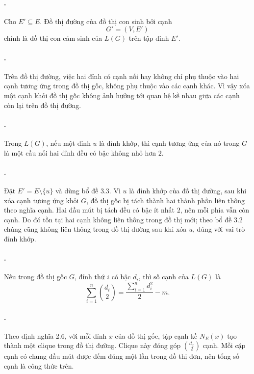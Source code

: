 \documentclass[11pt]{article}
\begin{document}
\paragraph{.}
Cho \(E'\subseteq E\). Đồ thị đường của đồ thị con sinh bởi cạnh
\[
  G'=(V,E')
\]
chính là đồ thị con cảm sinh của \(L(G)\) trên tập đỉnh \(E'\).

\paragraph{.}
Trên đồ thị đường, việc hai đỉnh có cạnh nối hay không chỉ phụ thuộc vào hai
cạnh tương ứng trong đồ thị gốc, không phụ thuộc vào các cạnh khác. Vì vậy xóa
một cạnh khỏi đồ thị gốc không ảnh hưởng tới quan hệ kề nhau giữa các cạnh còn
lại trên đồ thị đường.

\paragraph{.}
Trong \(L(G)\), nếu một đỉnh \(u\) là đỉnh khớp, thì cạnh tương ứng của nó
trong \(G\) là một cầu nối hai đỉnh đều có bậc không nhỏ hơn \(2\).

\paragraph{.}
Đặt \(E'=E\setminus\{u\}\) và dùng bổ đề 3.3. Vì \(u\) là đỉnh khớp của đồ thị
đường, sau khi xóa cạnh tương ứng khỏi \(G\), đồ thị gốc bị tách thành hai
thành phần liên thông theo nghĩa cạnh. Hai đầu mút bị tách đều có bậc ít nhất
\(2\), nên mỗi phía vẫn còn cạnh. Do đó tồn tại hai cạnh không liên thông trong
đồ thị mới; theo bổ đề 3.2 chúng cũng không liên thông trong đồ thị đường sau
khi xóa \(u\), đúng với vai trò đỉnh khớp.

\paragraph{.}
Nếu trong đồ thị gốc \(G\), đỉnh thứ \(i\) có bậc \(d_i\), thì số cạnh của
\(L(G)\) là
\[
  \sum_{i=1}^{n}\binom{d_i}{2}
  =\frac{\sum_{i=1}^{n} d_i^2}{2}-m.
\]

\paragraph{.}
Theo định nghĩa 2.6, với mỗi đỉnh \(x\) của đồ thị gốc, tập cạnh kề
\(N_E(x)\) tạo thành một clique trong đồ thị đường. Clique này đóng góp
\(\binom{d_x}{2}\) cạnh. Mỗi cặp cạnh có chung đầu mút được đếm đúng một lần
trong đồ thị đơn, nên tổng số cạnh là công thức trên.
\end{document}
